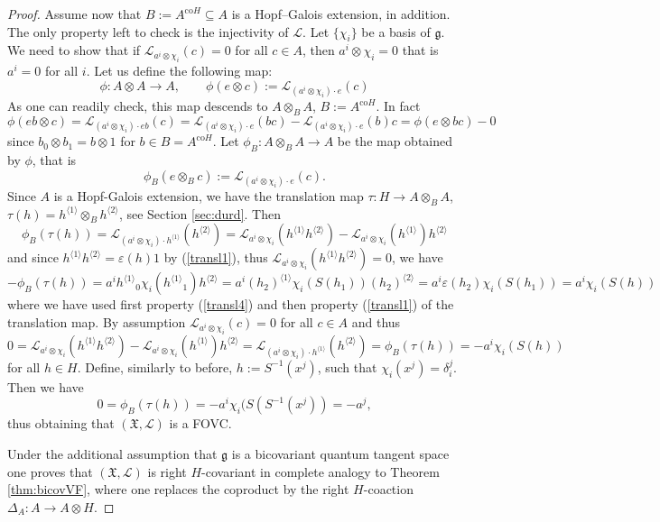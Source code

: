 \documentclass{article}
\theoremstyle{definition}
\newcommand{\lra}{{\longrightarrow}}
\newcommand{\fg}{{\mathfrak{g}}}
\begin{document}
\begin{proof}
	Assume now that $B:=A^{\mathrm{co}H}\subseteq A$ is a Hopf--Galois extension, in addition.
	The only property left to check is the injectivity of $\mathscr{L}$.
	Let $\{\chi_i\}$ be a basis of $\fg$. We need to show that if $\mathscr{L}_{a^i \otimes \chi_i}(c)=0$
	for all $c \in A$, then $a^i\otimes \chi_i=0$ that is $a^i=0$ for all $i$.
	Let us define the following map:
	$$
	\phi:A \otimes A \lra A, \qquad \phi(e \otimes c):=\mathscr{L}_{(a^i \otimes \chi_i)\cdot e}(c)
	$$
	As one can readily check, this map descends to $A\otimes_B A$, $B:=A^{\mathrm{co}H}$. 
	In fact
	$$
	\phi(eb\otimes c)
	=\mathscr{L}_{(a^i \otimes \chi_i)\cdot eb}(c)
	=\mathscr{L}_{(a^i\otimes\chi_i)\cdot e}(bc)-\mathscr{L}_{(a^i\otimes\chi_i)\cdot e}(b)c
	=\phi(e\otimes bc)-0
	$$
	since $b_0\otimes b_1=b\otimes 1$ for $b \in B=A^{\mathrm{co}H}$.
	Let $\phi_B:A \otimes_B A \lra A$ be the map obtained by $\phi$, that is 
	$$
	\phi_B(e \otimes_B c):=\mathscr{L}_{(a^i \otimes \chi_i)\cdot e}(c).
	$$
	Since $A$ is a Hopf-Galois extension, we have the translation map
	$\tau:H \to A\otimes_B A$, $\tau(h)=h^{\langle1\rangle} \otimes_B h^{\langle2\rangle}$, see Section \ref{sec:durd}. Then
	$$
	\phi_B(\tau(h))=\mathscr{L}_{(a^i \otimes \chi_i)\cdot h^{\langle1\rangle}}(h^{\langle2\rangle})=
	\mathscr{L}_{a^i \otimes \chi_i} (h^{\langle1\rangle}h^{\langle2\rangle})
	-\mathscr{L}_{a^i\otimes\chi_i}(h^{\langle 1\rangle})h^{\langle 2\rangle}
	$$
	and since $h^{\langle1\rangle}h^{\langle2\rangle}=\varepsilon(h)1$ by (\ref{transl1}), 
	thus $\mathscr{L}_{a^i \otimes \chi_i}( h^{\langle1\rangle}h^{\langle2\rangle})=0$, we have
	$$
	-\phi_B(\tau(h))=a^i {h^{\langle1\rangle}}_0\chi_i( {h^{\langle1\rangle}}_1) h^{\langle2\rangle}=a^i {(h_2)^{\langle1\rangle}}\chi_i(S(h_1)) (h_2)^{\langle2\rangle}=
	a^i\varepsilon(h_2)\chi_i(S(h_1))=a^i\chi_i(S(h))
	$$
	where we have used first property (\ref{transl4}) and then property (\ref{transl1}) of the translation map. 
	By assumption $\mathscr{L}_{a^i\otimes\chi_i}(c)=0$ for all $c\in A$ and thus
	$$
	0=\mathscr{L}_{a^i\otimes\chi_i}(h^{\langle 1\rangle}h^{\langle 2\rangle})-\mathscr{L}_{a^i\otimes\chi_i}(h^{\langle 1\rangle})h^{\langle 2\rangle}
	=\mathscr{L}_{(a^i\otimes\chi_i)\cdot h^{\langle 1\rangle}}(h^{\langle 2\rangle})
	=\phi_B(\tau(h))=-a^i\chi_i(S(h))
	$$
	for all $h\in H$.
	Define, similarly to before, 
	$h:=S^{-1}(x^j)$, such that $\chi_i(x^j)=\delta_i^j$. Then we have
	$$
	0=\phi_B(\tau(h))=-a^i\chi_i(S(S^{-1}(x^j))=-a^j,
	$$
	thus obtaining that $(\mathfrak{X},\mathscr{L})$ is a FOVC.
	
	Under the additional assumption that $\mathfrak{g}$ is a bicovariant quantum tangent space one proves that $(\mathfrak{X},\mathscr{L})$ is right $H$-covariant in complete analogy to Theorem \ref{thm:bicovVF}, where one replaces the coproduct by the right $H$-coaction $\Delta_A\colon A\to A\otimes H$.
\end{proof}
\end{document}
